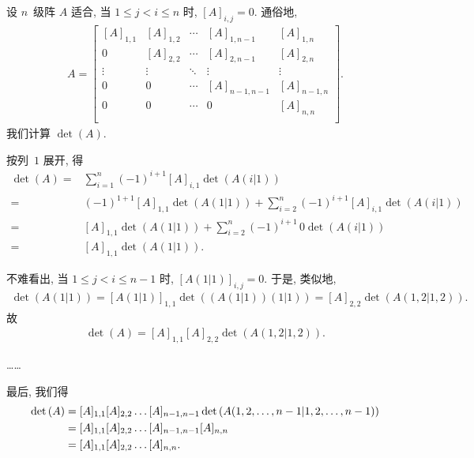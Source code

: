 \documentclass[../libro.tex]{subfiles}
\begin{document}
\begin{example}
    设 \(n\)~级阵 \(A\) 适合,
    当 \(1 \leq j < i \leq n\) 时,
    \([A]_{i,j} = 0\).
    通俗地,
    \begin{align*}
        A =
        \begin{bmatrix}
            [A]_{1,1} & [A]_{1,2} & \cdots & [A]_{1,n-1}   & [A]_{1,n}   \\
            0         & [A]_{2,2} & \cdots & [A]_{2,n-1}   & [A]_{2,n}   \\
            \vdots    & \vdots    & \ddots & \vdots        & \vdots      \\
            0         & 0         & \cdots & [A]_{n-1,n-1} & [A]_{n-1,n} \\
            0         & 0         & \cdots & 0             & [A]_{n,n}   \\
        \end{bmatrix}.
    \end{align*}
    我们计算 \(\det {(A)}\).

    按列~\(1\) 展开, 得
    \begin{align*}
        \det {(A)}
        = {} &
        \sum_{i=1}^{n}
        {(-1)^{i+1} [A]_{i,1} \det {(A(i|1))}}
        \\
        = {} &
        (-1)^{1+1} [A]_{1,1} \det {(A(1|1))}
        + \sum_{i=2}^{n}
        {(-1)^{i+1} [A]_{i,1} \det {(A(i|1))}}
        \\
        = {} &
        [A]_{1,1} \det {(A(1|1))}
        + \sum_{i=2}^{n}
        {(-1)^{i+1}\, 0 \det {(A(i|1))}}
        \\
        = {} &
        [A]_{1,1} \det {(A(1|1))}.
    \end{align*}

    不难看出, 当 \(1 \leq j < i \leq n-1\) 时,
    \([A(1|1)]_{i,j} = 0\).
    于是, 类似地,
    \begin{align*}
        \det {(A(1|1))}
        = [A(1|1)]_{1,1} \det {((A(1|1))(1|1))}
        = [A]_{2,2} \det {(A({1,2}|{1,2}))}.
    \end{align*}
    故
    \begin{align*}
        \det {(A)}
        = [A]_{1,1} [A]_{2,2} \det {(A({1,2}|{1,2}))}.
    \end{align*}

    ……

    最后, 我们得
    \begin{align*}
        \det {(A)}
        = {} &
        [A]_{1,1} [A]_{2,2} \dots [A]_{n-1,n-1}
        \det {(A({1,2,\dots,n-1}|{1,2,\dots,n-1}))}
        \\
        = {} &
        [A]_{1,1} [A]_{2,2} \dots [A]_{n-1,n-1} [A]_{n,n}
        \\
        = {} &
        [A]_{1,1} [A]_{2,2} \dots [A]_{n,n}.
        \qedhere
    \end{align*}
\end{example}
\end{document}
